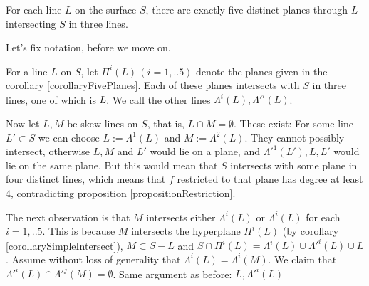 \begin{corollary} \label{corollaryFivePlanes}
For each line $L$ on the surface $S$, there are exactly five distinct planes through $L$ intersecting $S$ in three lines. 
\end{corollary}

Let's fix notation, before we move on.
\begin{definition}
For a line $L$ on $S$, let $\Pi^i(L) \, (i=1,..5)$ denote the planes given in the corollary \ref{corollaryFivePlanes}.
Each of these planes intersects with $S$ in three lines, one of which is $L$. We call the other lines $\Lambda^i(L), \Lambda'^i(L)$.
\end{definition}

Now let $L,M$ be skew lines on $S$, that is, $L\cap M = \emptyset$.
These exist: For some line $L' \subset S$ we can choose $L := \Lambda^1(L)$ and $M := \Lambda^2(L)$.
They cannot possibly intersect, otherwise $L,M$ and $L'$ would lie on a plane, and $\Lambda'^1(L'),L,L'$ would lie on the same plane.
But this would mean that $S$ intersects with some plane in four distinct lines, which means that $f$ restricted to that plane has degree at least 4, contradicting proposition \ref{propositionRestriction}.

The next observation is that $M$ intersects either $\Lambda^i(L)$ or $\Lambda^i(L)$ for each $i=1,..5$.
This is because $M$ intersects the hyperplane $\Pi^i(L)$ (by corollary \ref{corollarySimpleIntersect}), $M \subset S - L$ and $S \cap \Pi^i(L) = \Lambda^i(L) \cup \Lambda'^i(L) \cup L$.
Assume without loss of generality that $\Lambda^i(L) = \Lambda^i(M)$.
We claim that $\Lambda'^i(L) \cap \Lambda'^j(M) = \emptyset$.
Same argument as before: $L, \Lambda'^i(L)$



